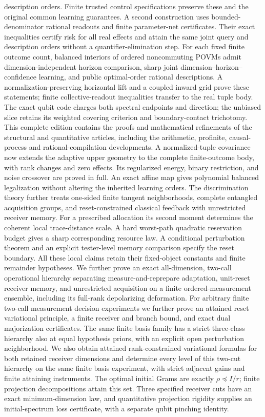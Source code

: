 \documentclass[11pt]{amsart}
\numberwithin{equation}{section}
\theoremstyle{definition}\newtheorem{definition}[theorem]{Definition}
\theoremstyle{remark}\newtheorem{remark}[theorem]{Remark}
\begin{document}
description orders.  Finite trusted control specifications preserve
these and the original common learning guarantees.
A second construction uses bounded-denominator rational readouts
and finite parameter-net certificates.  Their exact inequalities
certify risk for all real effects and attain the same joint query
and description orders without a quantifier-elimination step.
For each fixed finite outcome count, balanced interiors of ordered
noncommuting POVMs admit dimension-independent horizon comparison,
sharp joint dimension--horizon--confidence learning, and public
optimal-order rational descriptions.  A normalization-preserving
horizontal lift and a coupled inward grid prove these statements;
finite collective-readout inequalities transfer to the real tuple body.
The exact qubit code charges both spectral endpoints and direction;
the unbiased slice retains its weighted covering criterion and
boundary-contact trichotomy.
This complete edition contains the proofs and mathematical refinements
of the structural and quantitative articles, including the arithmetic,
profinite, causal-process and rational-compilation developments.
A normalized-tuple covariance now extends the adaptive upper geometry
to the complete finite-outcome body, with rank changes and zero effects.
Its regularized energy, binary restriction, and noise crossover are
proved in full.  An exact affine map gives polynomial balanced
legalization without altering the inherited learning orders.
The discrimination theory further treats one-sided finite tangent
neighborhoods, complete entangled acquisition groups, and
reset-constrained classical feedback with unrestricted receiver
memory.  For a prescribed allocation its second moment determines
the coherent local trace-distance scale.  A hard worst-path quadratic
reservation budget gives a sharp corresponding resource law.
A conditional perturbation theorem and an explicit tester-level
memory comparison specify the reset boundary.  All these local
claims retain their fixed-object constants and finite remainder
hypotheses.
We further prove an exact all-dimension, two-call operational hierarchy
separating measure-and-reprepare adaptation, unit-reset receiver memory,
and unrestricted acquisition on a finite ordered-measurement ensemble,
including its full-rank depolarizing deformation.
For arbitrary finite two-call measurement decision experiments we further
prove an attained reset variational principle, a finite receiver and
branch bound, and exact dual majorization certificates.  The same finite
basis family has a strict three-class hierarchy also at equal hypothesis
priors, with an explicit open perturbation neighborhood.
We also obtain attained rank-constrained variational formulas for both
retained receiver dimensions and determine every level of this two-cut
hierarchy on the same finite basis experiment, with strict adjacent
gains and finite attaining instruments.
The optimal initial Grams are exactly $\rho\preceq I/r$; finite
projection decompositions attain this set.  Three specified receiver
cuts have an exact minimum-dimension law, and quantitative projection
rigidity supplies an initial-spectrum loss certificate, with a separate
qubit pinching identity.
\end{document}
